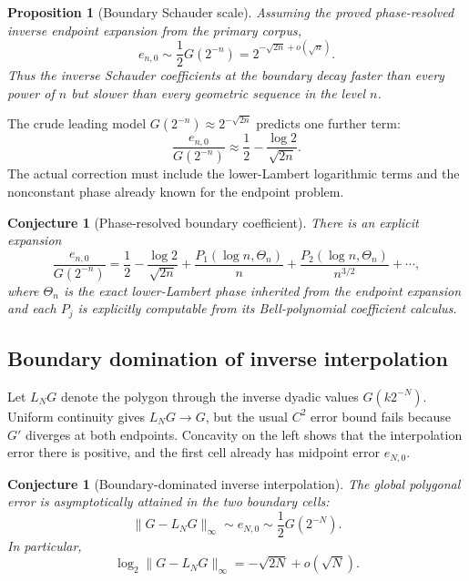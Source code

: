 \documentclass[11pt,oneside]{article}
\newtheorem{proposition}[theorem]{Proposition}
\newtheorem{conjecture}[theorem]{Conjecture}
\theoremstyle{definition}
\theoremstyle{remark}
\begin{document}
\begin{proposition}[Boundary Schauder scale]
\label{prop:boundary-Schauder}
Assuming the proved phase-resolved inverse endpoint expansion from the primary
corpus,
\begin{equation}\label{eq:e-boundary-asymptotic}
 e_{n,0}\sim\frac12G(2^{-n})
 =2^{-\sqrt{2n}+o(\sqrt n)}.
\end{equation}
Thus the inverse Schauder coefficients at the boundary decay faster than every
power of $n$ but slower than every geometric sequence in the level $n$.
\end{proposition}

The crude leading model $G(2^{-n})\approx2^{-\sqrt{2n}}$ predicts one further
term:
\begin{equation}\label{eq:e-boundary-model}
 \frac{e_{n,0}}{G(2^{-n})}
 \approx\frac12-\frac{\log2}{\sqrt{2n}}.
\end{equation}
The actual correction must include the lower-Lambert logarithmic terms and the
nonconstant phase already known for the endpoint problem.

\begin{conjecture}[Phase-resolved boundary coefficient]
\label{conj:inverse-boundary-phase}
There is an explicit expansion
\begin{equation}\label{eq:e-boundary-phase-conj}
 \frac{e_{n,0}}{G(2^{-n})}
 =\frac12-\frac{\log2}{\sqrt{2n}}
  +\frac{P_1(\log n,\Theta_n)}{n}
  +\frac{P_2(\log n,\Theta_n)}{n^{3/2}}+\cdots,
\end{equation}
where $\Theta_n$ is the exact lower-Lambert phase inherited from the endpoint
expansion and each $P_j$ is explicitly computable from its Bell-polynomial
coefficient calculus.
\end{conjecture}

\subsection{Boundary domination of inverse interpolation}

Let $L_NG$ denote the polygon through the inverse dyadic values
$G(k2^{-N})$.  Uniform continuity gives $L_NG\to G$, but the usual $C^2$
error bound fails because $G'$ diverges at both endpoints.  Concavity on the
left shows that the interpolation error there is positive, and the first cell
already has midpoint error $e_{N,0}$.

\begin{conjecture}[Boundary-dominated inverse interpolation]
\label{conj:G-interpolation}
The global polygonal error is asymptotically attained in the two boundary
cells:
\begin{equation}\label{eq:G-interpolation-conj}
 \|G-L_NG\|_\infty
 \sim e_{N,0}
 \sim\frac12G(2^{-N}).
\end{equation}
In particular,
\begin{equation}\label{eq:G-interpolation-rate}
 \log_2\|G-L_NG\|_\infty
 =-\sqrt{2N}+o(\sqrt N).
\end{equation}
\end{conjecture}
\end{document}
